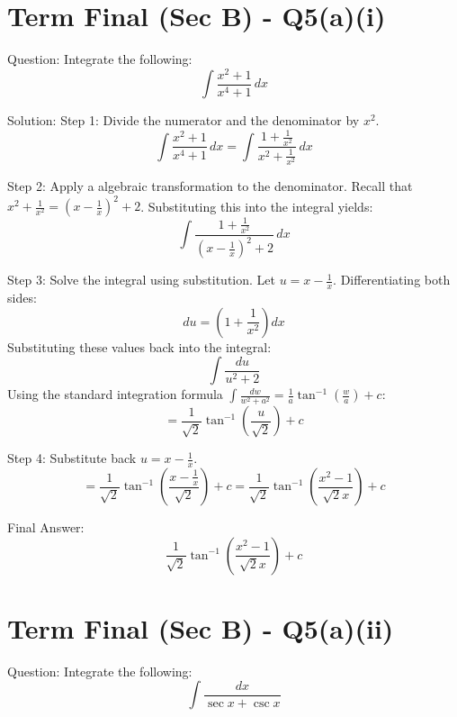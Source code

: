 \documentclass{article}
\begin{document}
\section*{Term Final (Sec B) - Q5(a)(i)}
Question:
Integrate the following:
\[
\int \frac{x^2+1}{x^4+1} \, dx
\]

Solution:
Step 1: Divide the numerator and the denominator by $x^2$.
\[
\int \frac{x^2+1}{x^4+1} \, dx = \int \frac{1 + \frac{1}{x^2}}{x^2 + \frac{1}{x^2}} \, dx
\]

Step 2: Apply a algebraic transformation to the denominator.
Recall that $x^2 + \frac{1}{x^2} = \left(x - \frac{1}{x}\right)^2 + 2$.
Substituting this into the integral yields:
\[
\int \frac{1 + \frac{1}{x^2}}{\left(x - \frac{1}{x}\right)^2 + 2} \, dx
\]

Step 3: Solve the integral using substitution.
Let $u = x - \frac{1}{x}$. Differentiating both sides:
\[
du = \left(1 + \frac{1}{x^2}\right) dx
\]
Substituting these values back into the integral:
\[
\int \frac{du}{u^2 + 2}
\]
Using the standard integration formula $\int \frac{dw}{w^2+a^2} = \frac{1}{a} \tan^{-1}\left(\frac{w}{a}\right) + c$:
\[
= \frac{1}{\sqrt{2}} \tan^{-1}\left(\frac{u}{\sqrt{2}}\right) + c
\]

Step 4: Substitute back $u = x - \frac{1}{x}$.
\[
= \frac{1}{\sqrt{2}} \tan^{-1}\left(\frac{x - \frac{1}{x}}{\sqrt{2}}\right) + c = \frac{1}{\sqrt{2}} \tan^{-1}\left(\frac{x^2-1}{\sqrt{2}x}\right) + c
\]

Final Answer:
\[
\boxed{\frac{1}{\sqrt{2}} \tan^{-1}\left(\frac{x^2-1}{\sqrt{2}x}\right) + c}
\]

\section*{Term Final (Sec B) - Q5(a)(ii)}
Question:
Integrate the following:
\[
\int \frac{dx}{\sec x + \csc x}
\]
\end{document}
